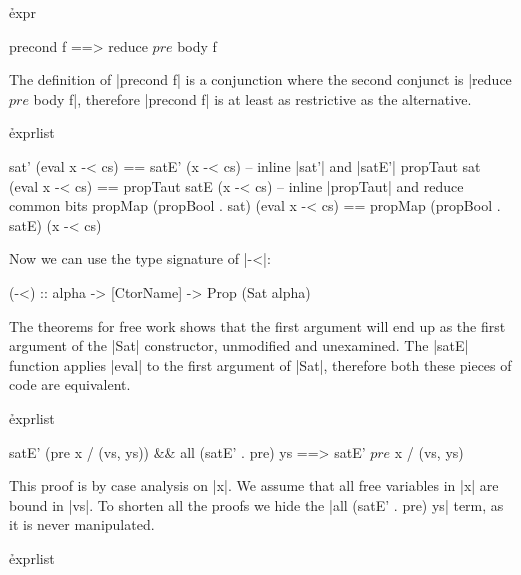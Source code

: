 
\h{expr}\begin{code}
precond f ==> reduce $ pre $ body f
\end{code}

The definition of |precond f| is a conjunction where the second conjunct is |reduce $ pre $ body f|, therefore |precond f| is at least as restrictive as the alternative.



\h{exprlist}\begin{code}
sat' (eval x -< cs) == satE' (x -< cs)
    -- inline |sat'| and |satE'|
propTaut sat (eval x -< cs) == propTaut satE (x -< cs)
    -- inline |propTaut| and reduce common bits
propMap (propBool . sat) (eval x -< cs) == propMap (propBool . satE) (x -< cs)
\end{code}

Now we can use the type signature of |-<|:

\begin{code}
(-<) :: alpha -> [CtorName] -> Prop (Sat alpha)
\end{code}

The theorems for free work \cite{wadler:theorems} shows that the first argument will end up as the first argument of the |Sat| constructor, unmodified and unexamined. The |satE| function applies |eval| to the first argument of |Sat|, therefore both these pieces of code are equivalent.



\h{exprlist}\begin{code}
satE' (pre x / (vs, ys)) && all (satE' . pre) ys ==> satE' $ pre $ x / (vs, ys)
\end{code}

This proof is by case analysis on |x|. We assume that all free variables in |x| are bound in |vs|. To shorten all the proofs we hide the |all (satE' . pre) ys| term, as it is never manipulated.


\h{exprlist}

